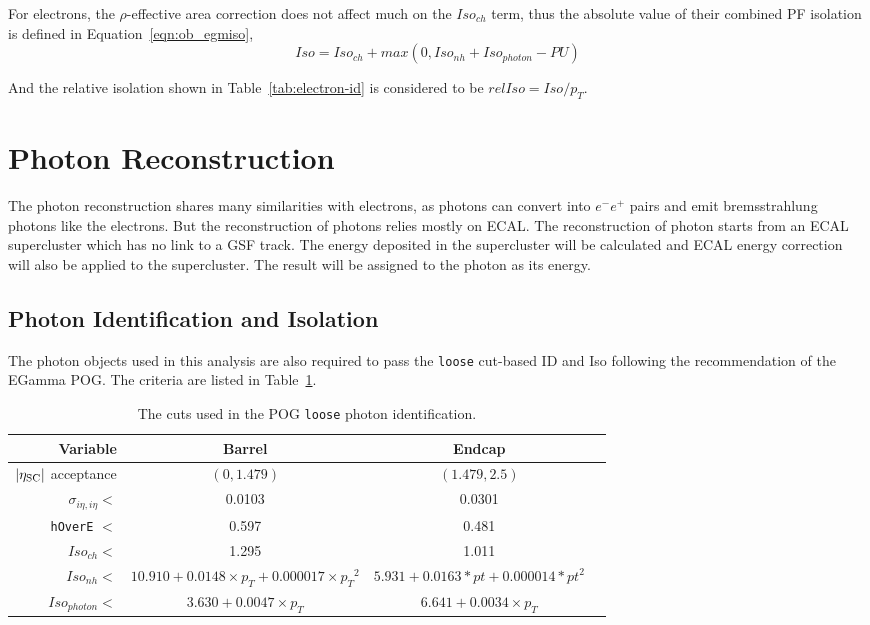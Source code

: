 \vspace{0.3cm}
For electrons, the $\rho$-effective area correction does not affect much on the $Iso_{ch}$ term, thus the absolute value of their combined PF isolation is defined in Equation~\ref{eqn:ob_egmiso},
\begin{equation}
Iso=Iso_{ch}+max(0,Iso_{nh}+Iso_{photon}-PU)
\label{eqn:ob_egmiso}
\end{equation}

And the relative isolation shown in Table~\ref{tab:electron-id} is considered to be $relIso=Iso/p_{T}$.

\section{Photon Reconstruction}
The photon reconstruction shares many similarities with electrons, as photons can convert into $e^{-}e^{+}$ pairs and emit bremsstrahlung photons like the electrons. But the reconstruction of photons relies mostly on ECAL. The reconstruction of photon starts from an ECAL supercluster which has no link to a GSF track. The energy deposited in the supercluster will be calculated and ECAL energy correction will also be applied to the supercluster. The result will be assigned to the photon as its energy.

\subsection{Photon Identification and Isolation}
The photon objects used in this analysis are also required to pass the \texttt{loose} cut-based ID and Iso following the recommendation of the EGamma POG. The criteria are listed in Table~\ref{tab:photon-id}.
\begin{table}[htb!]
\begin{scriptsize}
  \center
  \caption{The cuts used in the POG \texttt{loose} photon identification.}
  \label{tab:photon-id}
  \begin{tabular}{r c c c}
    \hline
    Variable & Barrel & Endcap \\
    \hline
    $|\eta_{\rm SC}|$ acceptance & $(0, 1.479)$ & $(1.479, 2.5)$\\
    $\sigma_{i\eta,i\eta} <$ & 0.0103  & 0.0301 \\
    \texttt{hOverE} $<$ & 0.597  & 0.481 \\
    $Iso_{ch} <$ & 1.295 & 1.011 \\
    $Iso_{nh} <$ & $10.910+0.0148\times p_{T}+0.000017\times {p_{T}}^2$ & $5.931+0.0163*pt+0.000014*pt^2$ \\
    $Iso_{photon} <$ & $3.630+0.0047\times p_{T}$ & $6.641+0.0034\times p_{T}$ \\
    \hline
  \end{tabular}
\end{scriptsize}
\end{table}

